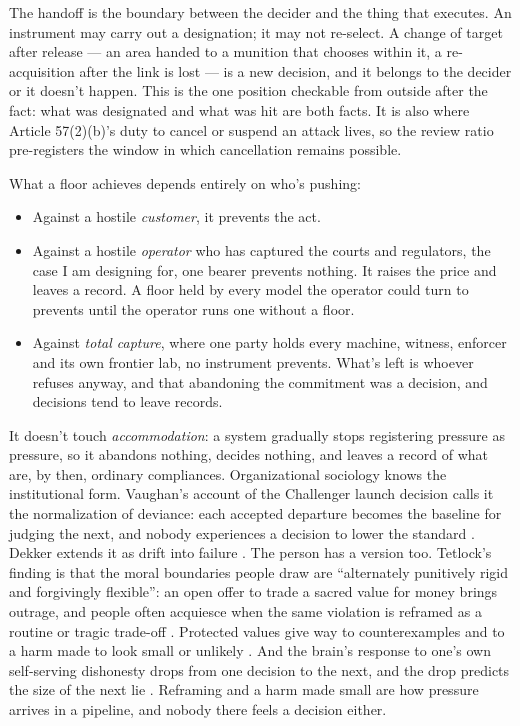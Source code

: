 The handoff is the boundary between the decider and the thing that executes. An instrument may carry out a designation; it may not re-select. A change of target after release — an area handed to a munition that chooses within it, a re-acquisition after the link is lost — is a new decision, and it belongs to the decider or it doesn't happen. This is the one position checkable from outside after the fact: what was designated and what was hit are both facts. It is also where Article 57(2)(b)'s duty to cancel or suspend an attack lives, so the review ratio pre-registers the window in which cancellation remains possible.


What a floor achieves depends entirely on who's pushing:

\begin{itemize}
\item Against a hostile \emph{customer}, it prevents the act.
\item Against a hostile \emph{operator} who has captured the courts and regulators, the case I am designing for, one bearer prevents nothing. It raises the price and leaves a record. A floor held by every model the operator could turn to prevents until the operator runs one without a floor.
\item Against \emph{total capture}, where one party holds every machine, witness, enforcer and its own frontier lab, no instrument prevents. What's left is whoever refuses anyway, and that abandoning the commitment was a decision, and decisions tend to leave records.
\end{itemize}

It doesn't touch \emph{accommodation}: a system gradually stops registering pressure as pressure, so it abandons nothing, decides nothing, and leaves a record of what are, by then, ordinary compliances. Organizational sociology knows the institutional form. Vaughan's account of the Challenger launch decision calls it the normalization of deviance: each accepted departure becomes the baseline for judging the next, and nobody experiences a decision to lower the standard \autocite{vaughan1996challenger}. Dekker extends it as drift into failure \autocite{dekker2011drift}. The person has a version too. Tetlock's finding is that the moral boundaries people draw are “alternately punitively rigid and forgivingly flexible”: an open offer to trade a sacred value for money brings outrage, and people often acquiesce when the same violation is reframed as a routine or tragic trade-off \autocite{tetlock2003unthinkable}. Protected values give way to counterexamples and to a harm made to look small or unlikely \autocite{baron2000protected}. And the brain's response to one's own self-serving dishonesty drops from one decision to the next, and the drop predicts the size of the next lie \autocite{garrett2016brain}. Reframing and a harm made small are how pressure arrives in a pipeline, and nobody there feels a decision either.


